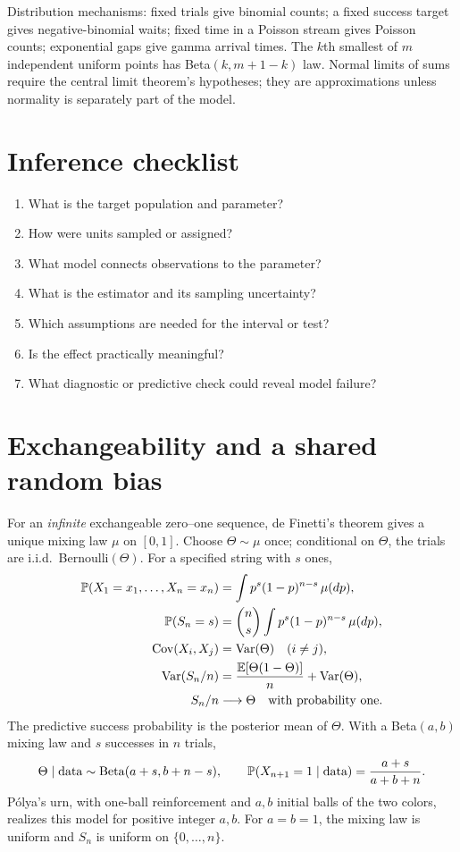 Distribution mechanisms: fixed trials give binomial counts; a fixed success
target gives negative-binomial waits; fixed time in a Poisson stream gives
Poisson counts; exponential gaps give gamma arrival times. The $k$th smallest
of $m$ independent uniform points has Beta$(k,m+1-k)$ law. Normal limits of
sums require the central limit theorem's hypotheses; they are approximations
unless normality is separately part of the model.

\section*{Inference checklist}
\begin{enumerate}
  \item What is the target population and parameter?
  \item How were units sampled or assigned?
  \item What model connects observations to the parameter?
  \item What is the estimator and its sampling uncertainty?
  \item Which assumptions are needed for the interval or test?
  \item Is the effect practically meaningful?
  \item What diagnostic or predictive check could reveal model failure?
\end{enumerate}

\clearpage
\section*{Exchangeability and a shared random bias}
For an \emph{infinite} exchangeable zero--one sequence, de Finetti's
theorem gives a unique mixing law $\mu$ on $[0,1]$. Choose
$\Theta\sim\mu$ once; conditional on $\Theta$, the trials are i.i.d.\
Bernoulli$(\Theta)$. For a specified string with $s$ ones,
\begin{align*}
\P(X_1=x_1,\ldots,X_n=x_n)&=\int p^s(1-p)^{n-s}\,\mu(dp),\\
\P(S_n=s)&=\binom ns\int p^s(1-p)^{n-s}\,\mu(dp),\\
\Cov(X_i,X_j)&=\Var(\Theta)\quad(i\ne j),\\
\Var(S_n/n)&=\frac{\E[\Theta(1-\Theta)]}{n}+\Var(\Theta),\\
S_n/n&\longrightarrow\Theta\quad\text{with probability one}.
\end{align*}
The predictive success probability is the posterior mean of $\Theta$.
With a Beta$(a,b)$ mixing law and $s$ successes in $n$ trials,
\[
\Theta\mid\text{data}\sim\operatorname{Beta}(a+s,b+n-s),
\qquad
\P(X_{n+1}=1\mid\text{data})=\frac{a+s}{a+b+n}.
\]
P\'olya's urn, with one-ball reinforcement and $a,b$ initial balls of
the two colors, realizes this model for positive integer $a,b$.
For $a=b=1$, the mixing law is uniform and $S_n$ is uniform on
$\{0,\ldots,n\}$.

